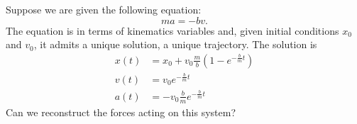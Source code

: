 Suppose we are given the following equation:
\begin{equation}\label{rp-cm-frictionEquation}
	m a = - b v .
\end{equation}
The equation is in terms of kinematics variables and, given initial conditions $x_0$ and $v_0$, it admits a unique solution, a unique trajectory.
The solution is
\begin{equation}
	\begin{aligned}
	x(t)&= x_0 + v_0 \frac{m}{b} \left( 1 - e^{-\frac{b}{m}t}\right) \\
	v(t)&= v_0 e^{-\frac{b}{m}t} \\
	a(t)&= - v_0 \frac{b}{m} e^{-\frac{b}{m}t}
	\end{aligned}
\end{equation}
Can we reconstruct the forces acting on this system?


